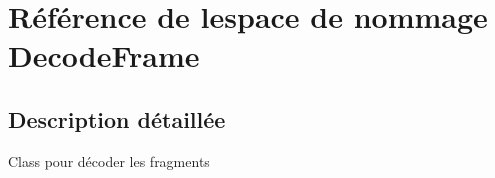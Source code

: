 \hypertarget{namespace_decode_frame}{}\section{Référence de l\textquotesingle{}espace de nommage Decode\+Frame}
\label{namespace_decode_frame}


\subsection{Description détaillée}
Class pour décoder les fragments 